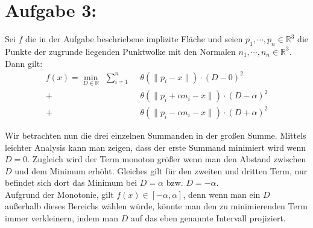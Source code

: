 \newpage
\section*{Aufgabe 3: }
Sei $f$ die in der Aufgabe beschriebene implizite Fläche und seien $p_1, \cdots, p_n \in \mathbb{R}^3$ die Punkte der zugrunde liegenden Punktwolke mit den Normalen $n_1, \cdots, n_n \in \mathbb{R}^3$.\\

Dann gilt:
\begin{align*}
  f(x) = \min_{D \in \mathbb{R}} \hspace{5pt} \sum_{i=1}^n \hspace{5pt} &\theta(\lVert p_i - x \rVert) \cdot (D - 0)^2 \\
  + &\theta(\lVert p_i + \alpha n_i - x \rVert) \cdot (D - \alpha)^2 \\
  + &\theta(\lVert p_i - \alpha n_i - x \rVert) \cdot (D + \alpha)^2
\end{align*}

Wir betrachten nun die drei einzelnen Summanden in der großen Summe. Mittels leichter Analysis kann man zeigen, dass der erste Summand minimiert wird wenn $D = 0$. Zugleich wird der Term monoton größer wenn man den Abstand zwischen $D$ und dem Minimum erhöht. Gleiches gilt für den zweiten und dritten Term, nur befindet sich dort das Minimum bei $D = \alpha$ bzw. $D = -\alpha$.\\

Aufgrund der Monotonie, gilt $f(x) \in [-\alpha, \alpha]$, denn wenn man ein $D$ außerhalb dieses Bereichs wählen würde, könnte man den zu minimierenden Term immer verkleinern, indem man $D$ auf das eben genannte Intervall projiziert.